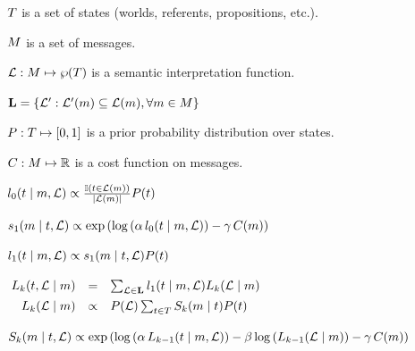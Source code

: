 \documentclass{article}
\begin{document}
\begin{examples}
\item
  \begin{examples}
  \item $\States$ is a set of states (worlds, referents, propositions, etc.).
  \item $\Messages$ is a set of messages.
  \item $\Lex: \Messages \mapsto \wp(\States)$ is a semantic interpretation function.
  \item $\LexSet = \set{\Lex' : \Lex'(\msg) \subseteq \Lex(\msg), \forall \msg \in \Messages}$
  \item $\Prior : \States \mapsto [0,1]$ is a prior probability
    distribution over states.    
  \item $\Costs : \Messages \mapsto \Reals$ is a cost function on messages.
  \end{examples}

\item\label{l0}%
  $\listenerZero(\state \given \msg, \Lex) \propto
  \frac{\mathbb{I}(\state \in \Lex(\msg))}{|\Lex(\msg)|}
  \Prior(\state)$

\item\label{s1}%
  $\speakerOne(\msg \given \state, \Lex) \propto
  \exp
  \left(
    \log\left(\alpha\,\listenerZero(\state \given \msg, \Lex) \right)
    - 
    \gamma\,\Costs(\msg)
  \right)$

\item\label{l1}%
  $\listenerOne(\state \given \msg, \Lex) \propto 
  \speakerOne(\msg \given \state, \Lex)
  \Prior(\state)$

\item\label{Lk}%
  \setlength{\arraycolsep}{2pt}%
  $\mspace{-4mu}\begin{array}[t]{r c l}
  \ListenerK(\state, \Lex \given \msg) 
  &=&
  \sum_{\Lex \in \LexSet} \listenerOne(\state \given \msg, \Lex) \ListenerK(\Lex \given \msg) 
  \\[1ex]
  \ListenerK(\Lex \given \msg) 
  &\propto& 
  \Prior(\Lex) \sum_{\state\in\States} \SpeakerK(\msg \given \state)\Prior(\state)
  \end{array}$

\item\label{Sk}%
  $\SpeakerK(\msg \given \state, \Lex) \propto 
  \exp
  \left(
    \log
    \left(\alpha\,\ListenerK[k-1](\state \given \msg, \Lex)\right)
    - 
    \beta \log\left(\ListenerK[k-1](\Lex\given\msg)\right)
    -
    \gamma\,\Costs(\msg)
  \right)$
\end{examples}
\end{document}
